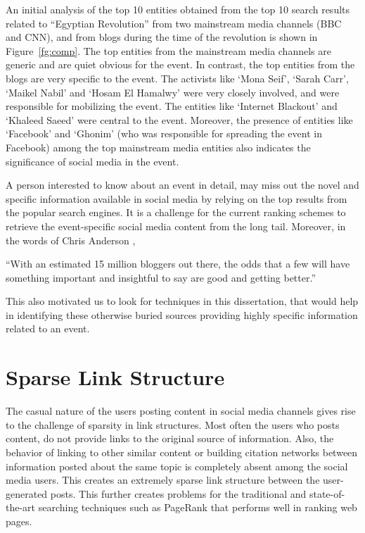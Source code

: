 An initial analysis of the top 10 entities obtained from the top 10 search results related to ``Egyptian Revolution'' from two mainstream media channels (BBC and CNN), and from blogs during the time of the revolution is shown in Figure~\ref{fg:comp}. The top entities from the mainstream media channels are generic and are quiet obvious for the event. In contrast, the top entities from the blogs are very specific to the event. The activists like `Mona Seif', `Sarah Carr', `Maikel Nabil' and `Hosam El Hamalwy' were very closely involved, and were responsible for mobilizing the event. The entities like `Internet Blackout' and `Khaleed Saeed' were central to the event. Moreover, the presence of entities like `Facebook' and `Ghonim' (who was responsible for spreading the event in Facebook) among the top mainstream media entities also indicates the significance of social media in the event.

A person interested to know about an event in detail, may miss out the novel and specific information available in social media by relying on the top results from the popular search engines. It is a challenge for the current ranking schemes to retrieve the event-specific social media content from the long tail. Moreover, in the words of Chris Anderson \cite{anderson2008long}, \begin{itshape} \small ``With an estimated 15 million bloggers out there, the odds that a few will have something important and insightful to say are good and getting better.'' \end{itshape} This also motivated us to look for techniques in this dissertation, that would help in identifying these otherwise buried sources providing highly specific information related to an event.

\section{Sparse Link Structure}
The casual nature of the users posting content in social media channels gives rise to the challenge of sparsity in link structures. Most often the users who posts content, do not provide links to the original source of information. Also, the behavior of linking to other similar content or building citation networks between information posted about the same topic is completely absent among the social media users. This creates an extremely sparse link structure between the user-generated posts. This further creates problems for the traditional and state-of-the-art searching techniques such as PageRank \cite{brin1998anatomy} that performs well in ranking web pages.

